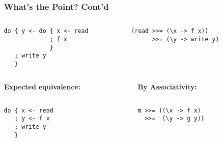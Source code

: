\documentclass{beamer}
\begin{document}
\begin{frame}[fragile]
\frametitle{What's the Point? Cont'd}
\begin{columns}[t]
{
  \begin{column}{5cm}
\begin{lstlisting}
do { y <- do { x <- read
             ; f x
             }
   ; write y    
   }   
\end{lstlisting}
  \end{column}
  }
  {
  \begin{column}{5cm}
\begin{lstlisting}
(read >>= (\x -> f x)) 
      >>= (\y -> write y)
      
\end{lstlisting}
  \end{column}
  }
\end{columns}
\begin{columns}[t]
  \begin{column}{5cm}
{
  \textbf{Expected equivalence:}
\begin{lstlisting}

do { x <- read
   ; y <- f x
   ; write y 
   }
\end{lstlisting}
}
  \end{column}
  \begin{column}{5cm}
{
\textbf{By Associativity:}
\begin{lstlisting}

m >>= ((\x -> f x) 
  >>=  (\y -> g y))
\end{lstlisting}
}
  \end{column}
\end{columns}
\end{frame}

\end{document}
